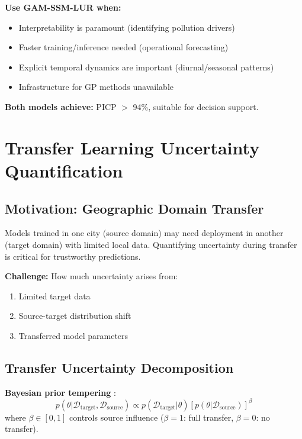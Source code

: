 \documentclass[11pt,letterpaper]{article}
\begin{document}
\textbf{Use GAM-SSM-LUR when:}
\begin{itemize}
    \item Interpretability is paramount (identifying pollution drivers)
    \item Faster training/inference needed (operational forecasting)
    \item Explicit temporal dynamics are important (diurnal/seasonal patterns)
    \item Infrastructure for GP methods unavailable
\end{itemize}

\textbf{Both models achieve:} PICP $>$ 94\%, suitable for decision support.


\section{Transfer Learning Uncertainty Quantification} \label{sec:transfer}

\subsection{Motivation: Geographic Domain Transfer}

Models trained in one city (source domain) may need deployment in another (target domain) with limited local data. Quantifying uncertainty during transfer is critical for trustworthy predictions.

\textbf{Challenge:} How much uncertainty arises from:
\begin{enumerate}
    \item Limited target data
    \item Source-target distribution shift
    \item Transferred model parameters
\end{enumerate}

\subsection{Transfer Uncertainty Decomposition}

\textbf{Bayesian prior tempering} \citep{yosinski2014transferable}:
\begin{equation}
p(\theta | \mathcal{D}_{\text{target}}, \mathcal{D}_{\text{source}}) \propto p(\mathcal{D}_{\text{target}} | \theta) \left[ p(\theta | \mathcal{D}_{\text{source}}) \right]^\beta
\label{eq:prior_tempering}
\end{equation}
where $\beta \in [0,1]$ controls source influence ($\beta=1$: full transfer, $\beta=0$: no transfer).
\end{document}
